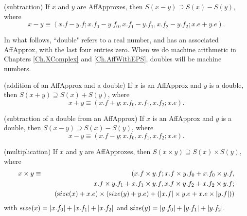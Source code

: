 \begin{proposition}{\label{GMT prop6.3} {\textrm (subtraction)}} \hskip-8pt If $x$ and $y$ are {\textrm AffApproxes,} then $S(x - y) \supseteq
S(x) - S(y)${\textrm ,}
 where
$$x - y \equiv (x.f - y.f; x.f_0 - y.f_0, x.f_1 - y.f_1, x.f_2 - y.f_2; x.e + y.e).$$ 
\end{proposition}

In what follows,  ``double" refers to a real number, and has an associated AffApprox, with the last four entries zero.  When we do
machine arithmetic in
Chapters \ref{Ch.XComplex} and \ref{Ch.AffWithEPS},
doubles will be  machine numbers.

\begin{proposition}{\label{GMT prop6.4} {\textrm (addition of an AffApprox and a double)}} If $x$ is an {\textrm AffApprox}  and $y$ is a double{\textrm ,}
 then $S(x +
y)
\supseteq S(x) + S(y)${\textrm ,} where
$$x + y \equiv (x.f + y; x.f_0, x.f_1 , x.f_2 ; x.e).$$ 
\end{proposition}

\begin{proposition}{\label{GMT prop6.5} {\textrm (subtraction of a double from an AffApprox)}}  If $x$ is an {\textrm AffApprox} and $y$ is a double{\textrm ,}
 then
$S(x - y)
\supseteq S(x) - S(y)${\textrm ,} where
$$x - y \equiv (x.f - y; x.f_0, x.f_1 , x.f_2 ; x.e).$$ 
\end{proposition}

\begin{proposition}{\label{GMT prop6.6} {\textrm (multiplication)}}  If $x$ and $y$ are {\textrm AffApproxes,}
 then $S(x \times y) \supseteq S(x) \times
S(y)${\textrm ,} where
\begin{eqnarray*}
x \times y &\equiv& (x.f \times y.f; x.f \times y.f_0 + x.f_0 \times y.f, \\
&& \quad
x.f \times y.f_1 + x.f_1 \times y.f, x.f \times y.f_2 + x.f_2 \times y.f; 
\\
&& \quad
({\textrm size}(x) + x.e) \times ({\textrm size}(y) + y.e) + (|x.f| \times y.e + x.e \times |y.f|))
                                            \end{eqnarray*}
 with ${\textrm size}(x) = |x.f_0| + |x.f_1| + |x.f_2|$ and ${\textrm size}(y) = |y.f_0| + |y.f_1| + |y.f_2|.$
\end{proposition}

